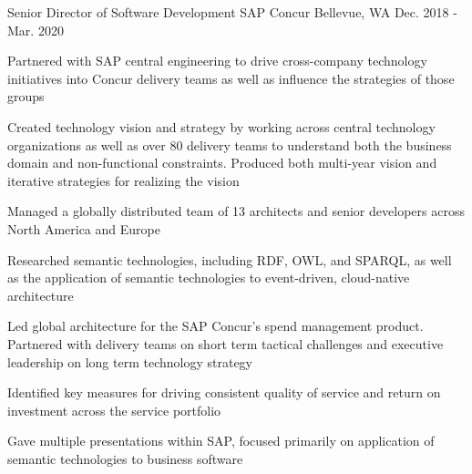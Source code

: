 \begin{cventries}

\cventry
{Senior Director of Software Development}
{SAP Concur}
{Bellevue, WA}
{Dec. 2018 - Mar. 2020}
{
  \begin{cvitems}
  \item {Partnered with SAP central engineering to drive cross-company technology initiatives into Concur delivery teams as well as influence the strategies of those groups}
  \item {Created technology vision and strategy by working across central technology organizations as well as over 80 delivery teams to understand both the business domain and non-functional constraints. Produced both multi-year vision and iterative strategies for realizing the vision}
  \item {Managed a globally distributed team of 13 architects and senior developers across North America and Europe}
  \item {Researched semantic technologies, including RDF, OWL, and SPARQL, as well as the application of semantic technologies to event-driven, cloud-native architecture}
  \item {Led global architecture for the SAP Concur’s spend management product. Partnered with delivery teams on short term tactical challenges and executive leadership on long term technology strategy}
  \item {Identified key measures for driving consistent quality of service and return on investment across the service portfolio}
  \item {Gave multiple presentations within SAP, focused primarily on application of semantic technologies to business software}
  \end{cvitems}
}



\end{cventries}
